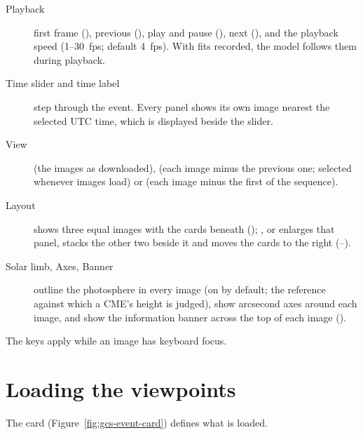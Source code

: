 \begin{description}
  \item[Playback] first frame (), previous (), play and pause (),
    next (), and the playback speed (1--30~fps; default 4~fps). With fits recorded, the
    model follows them during playback.
  \item[Time slider and time label] step through the event. Every panel shows its own image
    nearest the selected UTC time, which is displayed beside the slider.
  \item[View]  (the images as downloaded),  (each image minus the
    previous one; selected whenever images load) or  (each image minus the first
    of the sequence).
  \item[Layout]  shows three equal images with the cards beneath ();
    ,  or  enlarges that panel, stacks the other two beside it and moves
    the cards to the right (--).
  \item[Solar limb, Axes, Banner] outline the photosphere in every image (on by default; the
    reference against which a CME's height is judged), show arcsecond axes around each image,
    and show the information banner across the top of each image ().
\end{description}
The keys apply while an image has keyboard focus.

\section{Loading the viewpoints}
\label{sec:gcs-event-card}

The  card (Figure~\ref{fig:gcs-event-card}) defines what is
loaded.


